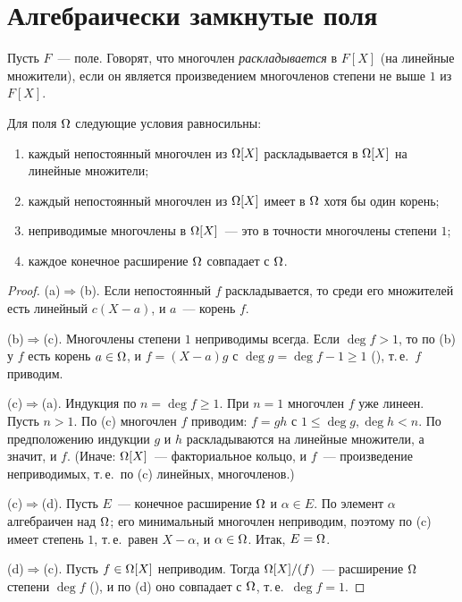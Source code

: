 \section{Алгебраически замкнутые поля}

Пусть $F$~--- поле. Говорят, что многочлен \emph{раскладывается} в $F[X]$ (на линейные множители), если он является
произведением многочленов степени не выше $1$ из $F[X]$.

\begin{proposition}[1.43]
Для поля $\Omega$ следующие условия равносильны:
\begin{enumerate}[label=(\alph*),leftmargin=*]
\item каждый непостоянный многочлен из $\Omega[X]$ раскладывается в $\Omega[X]$ на линейные множители;
\item каждый непостоянный многочлен из $\Omega[X]$ имеет в $\Omega$ хотя бы один корень;
\item неприводимые многочлены в $\Omega[X]$~--- это в точности многочлены степени $1$;
\item каждое конечное расширение $\Omega$ совпадает с $\Omega$.
\end{enumerate}
\end{proposition}

\begin{proof}
(a)$\Rightarrow$(b). Если непостоянный $f$ раскладывается, то среди его множителей есть линейный $c(X-a)$, и $a$~---
корень $f$.

(b)$\Rightarrow$(c). Многочлены степени $1$ неприводимы всегда. Если $\deg f>1$, то по (b) у $f$ есть корень $a\in\Omega$, и
$f=(X-a)g$ с $\deg g=\deg f-1\ge1$ (), т.\,е.\ $f$ приводим.

(c)$\Rightarrow$(a). Индукция по $n=\deg f\ge1$. При $n=1$ многочлен $f$ уже линеен. Пусть $n>1$. По (c) многочлен $f$
приводим: $f=gh$ с $1\le\deg g,\deg h<n$. По предположению индукции $g$ и $h$ раскладываются на линейные множители, а
значит, и $f$. (Иначе: $\Omega[X]$~--- факториальное кольцо, и $f$~--- произведение неприводимых, т.\,е.\ по (c) линейных,
многочленов.)

(c)$\Rightarrow$(d). Пусть $E$~--- конечное расширение $\Omega$ и $\alpha\in E$. По  элемент $\alpha$ алгебраичен над
$\Omega$; его минимальный многочлен неприводим, поэтому по (c) имеет степень $1$, т.\,е.\ равен $X-\alpha$, и $\alpha\in\Omega$.
Итак, $E=\Omega$.

(d)$\Rightarrow$(c). Пусть $f\in\Omega[X]$ неприводим. Тогда $\Omega[X]/(f)$~--- расширение $\Omega$ степени $\deg f$ (), и
по (d) оно совпадает с $\Omega$, т.\,е.\ $\deg f=1$.
\end{proof}

